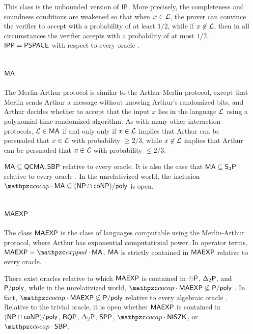 This class is the unbounded version of $\mathsf{IP}$. More precisely, the 
completeness and soundness conditions are weakened so that when $x\in\mathcal{L}$, the 
prover can convince the verifier to accept with a probability of at least $1/2$,
while if $x\not\in\mathcal{L}$, then in all circumstances the verifier accepts with a 
probability of at most $1/2$. $\mathsf{IPP}=\mathsf{PSPACE}$ with respect to every 
oracle \cite{chang1994random}.

\subsection{$\mathsf{MA}$}

The Merlin-Arthur protocol is similar to the Arthur-Merlin protocol, except that
Merlin sends Arthur a message without knowing Arthur's randomized bits, and 
Arthur decides whether to accept that the input $x$ lies in the language $\mathcal{L}$ 
using a polynomial-time randomized algorithm. As with many other interaction 
protocols, $\mathcal{L}\in\mathsf{MA}$ if and only only if $x\in\mathcal{L}$ implies that Arthur 
can be persuaded that $x\in\mathcal{L}$ with probability $\geq 2/3$, while $x\not\in\mathcal{L}$
implies that Arthur can be persuaded that $x\in\mathcal{L}$ with probability $\leq 2/3$.

$\mathsf{MA}\subseteq\mathsf{QCMA},\mathsf{SBP}$ relative to every oracle. It is also the
case that $\mathsf{MA}\subseteq\mathsf{S}_2\mathsf{P}$ relative to every oracle 
\cite{russell1998symmetric}. In the unrelativized world, the inclusion 
$\cocap\cdot\msf{MA}\subseteq(\NP\cap\co\NP)/\poly$ is open.

\subsection{$\mathsf{MAEXP}$}

The class $\mathsf{MAEXP}$ is the class of languages computable using the 
Merlin-Arthur protocol, where Arthur has exponential computational power. In 
operator terms, $\msf{MAEXP}=\exppad\cdot\msf{MA}$. $\mathsf{MA}$ is strictly 
contained in $\mathsf{MAEXP}$ relative to every oracle.

There exist oracles relative to which $\mathsf{MAEXP}$ is contained in $\oplus\mathsf{P}$,
$\Delta_2\mathsf{P}$, and $\mathsf{P}/\mathsf{poly}$, while in the unrelativized world, 
$\cocap\cdot\msf{MAEXP}\not\subseteq\sP/\poly$ 
\cite{buhrman1998nonrelativizing}. In fact, 
$\cocap\cdot\msf{MAEXP}\not\subseteq\sP/\poly$ relative to every algebraic 
oracle \cite{aaronson2009algebrization}. Relative to the trivial oracle, it is 
open whether $\mathsf{MAEXP}$ is contained in $(\mathsf{NP}\cap\mathsf{co}\mathsf{NP})/\mathsf{poly}$, $\mathsf{BQP}$,
$\Delta_2\mathsf{P}$, $\mathsf{SPP}$, $\cocap\cdot\msf{NISZK}$, or $\cocap\cdot\msf{SBP}$.

